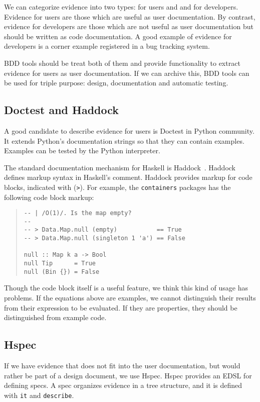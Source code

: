 \documentclass[preprint]{sigplanconf}
\begin{document}
We can categorize evidence into two types: for users and
and for developers.
Evidence for users are those which are useful as user documentation.
By contrast, evidence for developers are
those which are not useful as user documentation
but should be written as code documentation.
A good example of evidence for developers
is a corner example registered in a bug tracking system.

BDD tools should be treat both of them and provide functionality
to extract evidence for users as user documentation.
If we can archive this, BDD tools can be used for
triple purpose: design, documentation and automatic testing.

\subsection{Doctest and Haddock}

A good candidate to describe evidence for users is Doctest in Python community.
It extends Python's documentation strings so that they
can contain examples.
Examples can be tested by the Python interpreter.

The standard documentation mechanism for Haskell is
Haddock~\cite{haddock}.
Haddock defines markup syntax in Haskell's comment.
Haddock provides markup for code blocks, indicated with ({\tt >}).
For example, the {\tt containers} packages has the following code block markup:

\begin{quote}
\small
\begin{verbatim}
-- | /O(1)/. Is the map empty?
--
-- > Data.Map.null (empty)           == True
-- > Data.Map.null (singleton 1 'a') == False

null :: Map k a -> Bool
null Tip      = True
null (Bin {}) = False
\end{verbatim}
\end{quote}

\noindent Though the code block itself is a useful feature,
we think this kind of usage has problems.
If the equations above are examples, we cannot distinguish
their results from their expression to be evaluated.
If they are properties, they should be distinguished
from example code.

\subsection{Hspec}

If we have evidence that does not fit into the user documentation, but
would rather be part of a design document, we use Hspec.  Hspec
provides an EDSL for defining specs.  A spec organizes evidence in a
tree structure, and it is defined with \texttt{it} and
\texttt{describe}.
\end{document}
